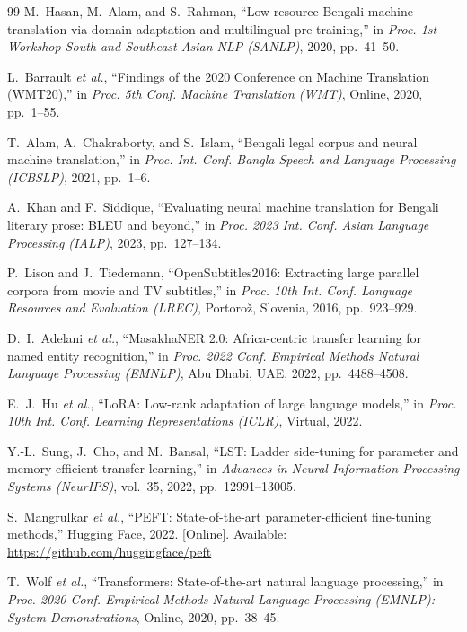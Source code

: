 \documentclass[conference]{IEEEtran}
\begin{document}
\begin{thebibliography}{99}
M.~Hasan, M.~Alam, and S.~Rahman,
``Low-resource Bengali machine translation via domain adaptation and
multilingual pre-training,''
in \emph{Proc. 1st Workshop South and Southeast Asian NLP (SANLP)},
2020, pp.~41--50.

L.~Barrault \textit{et al.},
``Findings of the 2020 Conference on Machine Translation (WMT20),''
in \emph{Proc. 5th Conf. Machine Translation (WMT)},
Online, 2020, pp.~1--55.

T.~Alam, A.~Chakraborty, and S.~Islam,
``Bengali legal corpus and neural machine translation,''
in \emph{Proc. Int. Conf. Bangla Speech and Language Processing (ICBSLP)},
2021, pp.~1--6.

A.~Khan and F.~Siddique,
``Evaluating neural machine translation for Bengali literary prose:
BLEU and beyond,''
in \emph{Proc. 2023 Int. Conf. Asian Language Processing (IALP)},
2023, pp.~127--134.

P.~Lison and J.~Tiedemann,
``OpenSubtitles2016: Extracting large parallel corpora from movie and
TV subtitles,''
in \emph{Proc. 10th Int. Conf. Language Resources and Evaluation (LREC)},
Portoro\v{z}, Slovenia, 2016, pp.~923--929.

D.~I.~Adelani \textit{et al.},
``MasakhaNER 2.0: Africa-centric transfer learning for named entity
recognition,''
in \emph{Proc. 2022 Conf. Empirical Methods Natural Language Processing
(EMNLP)},
Abu Dhabi, UAE, 2022, pp.~4488--4508.

E.~J.~Hu \textit{et al.},
``LoRA: Low-rank adaptation of large language models,''
in \emph{Proc. 10th Int. Conf. Learning Representations (ICLR)},
Virtual, 2022.

Y.-L.~Sung, J.~Cho, and M.~Bansal,
``LST: Ladder side-tuning for parameter and memory efficient transfer
learning,''
in \emph{Advances in Neural Information Processing Systems (NeurIPS)},
vol.~35, 2022, pp.~12991--13005.

S.~Mangrulkar \textit{et al.},
``PEFT: State-of-the-art parameter-efficient fine-tuning methods,''
Hugging Face, 2022. [Online].
Available: \url{https://github.com/huggingface/peft}

T.~Wolf \textit{et al.},
``Transformers: State-of-the-art natural language processing,''
in \emph{Proc. 2020 Conf. Empirical Methods Natural Language Processing
(EMNLP): System Demonstrations},
Online, 2020, pp.~38--45.


\end{thebibliography}
\end{document}
